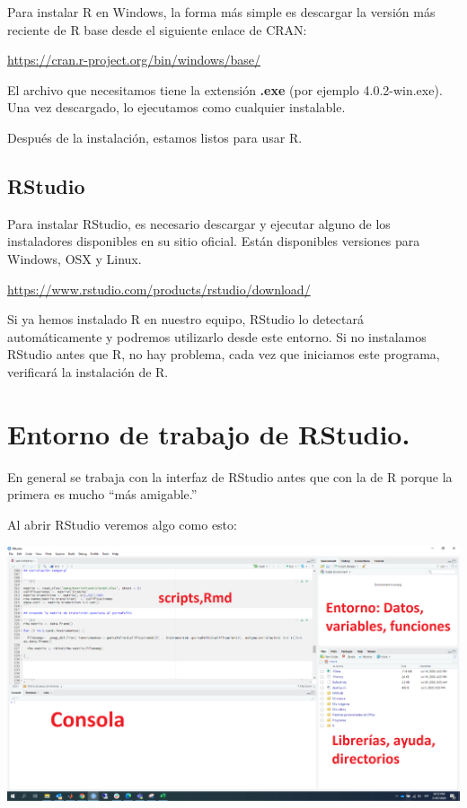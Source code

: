 \documentclass[
  12pt,
]{book}
\begin{document}
Para instalar R en Windows, la forma más simple es descargar la versión más reciente de R base desde el siguiente enlace de CRAN:

\url{https://cran.r-project.org/bin/windows/base/}

El archivo que necesitamos tiene la extensión \textbf{.exe} (por ejemplo 4.0.2-win.exe). Una vez descargado, lo ejecutamos como cualquier instalable.

Después de la instalación, estamos listos para usar R.

\hypertarget{rstudio}{%
\subsection{\texorpdfstring{\textbf{RStudio}}{RStudio}}\label{rstudio}}

Para instalar RStudio, es necesario descargar y ejecutar alguno de los instaladores disponibles en su sitio oficial. Están disponibles versiones para Windows, OSX y Linux.

\url{https://www.rstudio.com/products/rstudio/download/}

Si ya hemos instalado R en nuestro equipo, RStudio lo detectará automáticamente y podremos utilizarlo desde este entorno. Si no instalamos RStudio antes que R, no hay problema, cada vez que iniciamos este programa, verificará la instalación de R.

\hypertarget{entorno-de-trabajo-de-rstudio.}{%
\section{\texorpdfstring{\textbf{Entorno de trabajo de RStudio.}}{Entorno de trabajo de RStudio.}}\label{entorno-de-trabajo-de-rstudio.}}

En general se trabaja con la interfaz de RStudio antes que con la de R porque la primera es mucho ``más amigable.''

Al abrir RStudio veremos algo como esto:

\begin{center}\includegraphics[width=1\linewidth]{images/entornoRStudio} \end{center}
\end{document}
